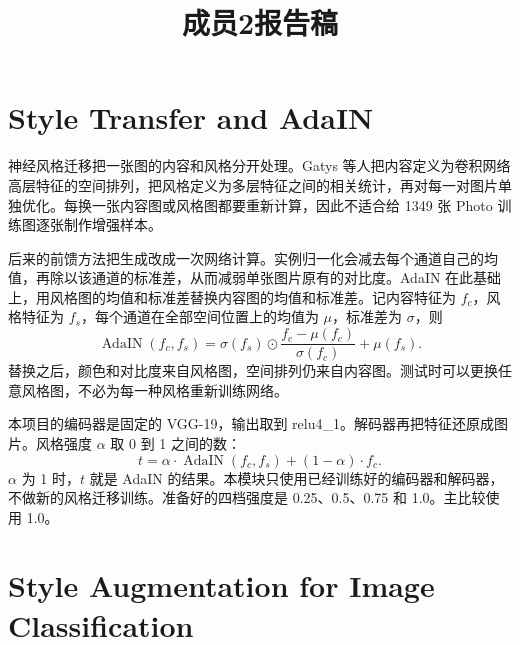 \documentclass[UTF8,a4paper]{ctexart}
\title{成员2报告稿}
\author{}
\date{}
\begin{document}
\maketitle

\section{Style Transfer and AdaIN}

神经风格迁移把一张图的内容和风格分开处理。Gatys 等人把内容定义为卷积网络高层特征的空间排列，把风格定义为多层特征之间的相关统计，再对每一对图片单独优化\cite{gatys2016image}。每换一张内容图或风格图都要重新计算，因此不适合给 1349 张 Photo 训练图逐张制作增强样本。

后来的前馈方法把生成改成一次网络计算。实例归一化会减去每个通道自己的均值，再除以该通道的标准差，从而减弱单张图片原有的对比度\cite{ulyanov2016instance,ulyanov2017improved}。AdaIN 在此基础上，用风格图的均值和标准差替换内容图的均值和标准差\cite{huang2017adain}。记内容特征为 $f_c$，风格特征为 $f_s$，每个通道在全部空间位置上的均值为 $\mu$，标准差为 $\sigma$，则
\begin{equation}
\operatorname{AdaIN}(f_c,f_s)
=
\sigma(f_s)\odot\frac{f_c-\mu(f_c)}{\sigma(f_c)}+\mu(f_s).
\end{equation}
替换之后，颜色和对比度来自风格图，空间排列仍来自内容图。测试时可以更换任意风格图，不必为每一种风格重新训练网络。

本项目的编码器是固定的 VGG-19，输出取到 relu4\_1。解码器再把特征还原成图片。风格强度 $\alpha$ 取 0 到 1 之间的数：
\begin{equation}
t=\alpha\cdot\operatorname{AdaIN}(f_c,f_s)+(1-\alpha)\cdot f_c.
\end{equation}
$\alpha$ 为 1 时，$t$ 就是 AdaIN 的结果。本模块只使用已经训练好的编码器和解码器，不做新的风格迁移训练。准备好的四档强度是 0.25、0.5、0.75 和 1.0。主比较使用 1.0。

\section{Style Augmentation for Image Classification}
\end{document}
